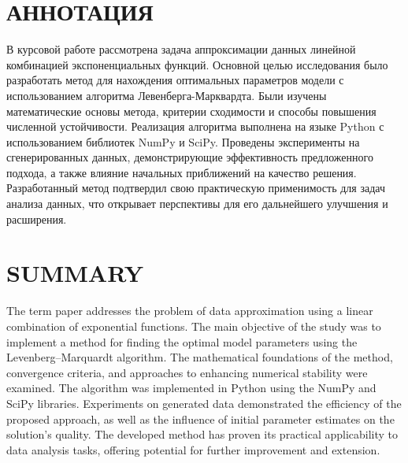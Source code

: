 \newpage

\section*{АННОТАЦИЯ}
\begin{minipage}[t][0.4\textheight][t]{0.9\linewidth}
	\setlength{\parindent}{1.25cm}
	\indent
	В курсовой работе рассмотрена задача аппроксимации данных линейной комбинацией экспоненциальных функций. Основной целью исследования было разработать метод для нахождения оптимальных параметров модели с использованием алгоритма Левенберга-Марквардта. Были изучены математические основы метода, критерии сходимости и способы повышения численной устойчивости. Реализация алгоритма выполнена на языке Python с использованием библиотек NumPy и SciPy. Проведены эксперименты на сгенерированных данных, демонстрирующие эффективность предложенного подхода, а также влияние начальных приближений на качество решения. Разработанный метод подтвердил свою практическую применимость для задач анализа данных, что открывает перспективы для его дальнейшего улучшения и расширения.
\end{minipage}

\section*{SUMMARY}
\begin{minipage}[t][0.4\textheight][t]{0.9\linewidth}
	\setlength{\parindent}{1.25cm}
	\indent
	The term paper addresses the problem of data approximation using a linear combination of exponential functions. The main objective of the study was to implement a method for finding the optimal model parameters using the Levenberg–Marquardt algorithm. The mathematical foundations of the method, convergence criteria, and approaches to enhancing numerical stability were examined. The algorithm was implemented in Python using the NumPy and SciPy libraries. Experiments on generated data demonstrated the efficiency of the proposed approach, as well as the influence of initial parameter estimates on the solution's quality. The developed method has proven its practical applicability to data analysis tasks, offering potential for further improvement and extension.
\end{minipage}

\newpage

\let \savenumberline \numberline
\def \numberline#1{\savenumberline{#1.}}

